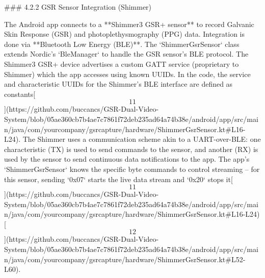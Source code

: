 \documentclass[12pt,a4paper]{article}
\begin{document}
{### 4.2.2 GSR Sensor Integration (Shimmer)

The Android app connects to a **Shimmer3 GSR+ sensor** to record
Galvanic Skin Response (GSR) and photoplethysmography (PPG) data.
Integration is done via **Bluetooth Low Energy (BLE)**. The
`ShimmerGsrSensor` class extends Nordic's `BleManager` to handle the GSR
sensor's BLE protocol. The Shimmer3 GSR+ device advertises a custom GATT
service (proprietary to Shimmer) which the app accesses using known
UUIDs. In the code, the service and characteristic UUIDs for the
Shimmer's BLE interface are defined as
constants[\[11\]](https://github.com/buccancs/GSR-Dual-Video-System/blob/05ae360cb7b4ae7c7861f72deb235ad64a74b38e/android/app/src/main/java/com/yourcompany/gsrcapture/hardware/ShimmerGsrSensor.kt#L16-L24).
The Shimmer uses a communication scheme akin to a UART-over-BLE: one
characteristic (TX) is used to send commands to the sensor, and another
(RX) is used by the sensor to send continuous data notifications to the
app. The app's `ShimmerGsrSensor` knows the specific byte commands to
control streaming -- for this sensor, sending `0x07` starts the live
data stream and `0x20` stops
it[\[11\]](https://github.com/buccancs/GSR-Dual-Video-System/blob/05ae360cb7b4ae7c7861f72deb235ad64a74b38e/android/app/src/main/java/com/yourcompany/gsrcapture/hardware/ShimmerGsrSensor.kt#L16-L24)[\[12\]](https://github.com/buccancs/GSR-Dual-Video-System/blob/05ae360cb7b4ae7c7861f72deb235ad64a74b38e/android/app/src/main/java/com/yourcompany/gsrcapture/hardware/ShimmerGsrSensor.kt#L52-L60).

}
\end{document}
